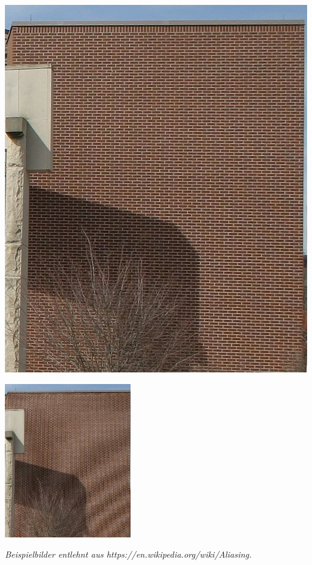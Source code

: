 \documentclass{article}
\begin{document}
\begin{minipage}[t]{.49\textwidth}
    \centering
    \includegraphics[width=.7\textwidth]{aliasing_ex_1.jpg}
\end{minipage}
\begin{minipage}[t]{.49\textwidth}
    \centering
    \includegraphics[width=.7\textwidth]{aliasing_ex_2.jpg}
\end{minipage}

\emph{Beispielbilder entlehnt aus https://en.wikipedia.org/wiki/Aliasing.}
\end{document}
